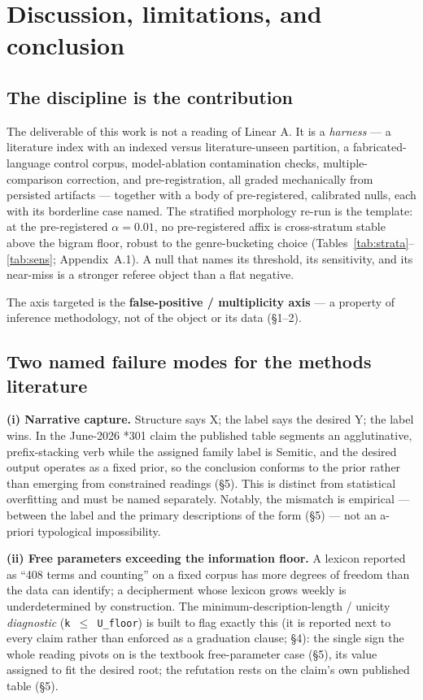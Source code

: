 \section{Discussion, limitations, and conclusion}

\subsection{The discipline is the contribution}

The deliverable of this work is not a reading of Linear A. It is a
\emph{harness} --- a literature index with an indexed versus
literature-unseen partition, a fabricated-language control corpus,
model-ablation contamination checks, multiple-comparison correction, and
pre-registration, all graded mechanically from persisted artifacts ---
together with a body of pre-registered, calibrated nulls, each with its
borderline case named. The stratified morphology re-run is the template: at
the pre-registered $\alpha = 0.01$, no pre-registered affix is cross-stratum
stable above the bigram floor, robust to the genre-bucketing choice
(Tables~\ref{tab:strata}--\ref{tab:sens}; Appendix~A.1). A null that
names its threshold, its sensitivity, and its
near-miss is a stronger referee object than a flat negative.

The axis targeted is the \textbf{false-positive / multiplicity axis} ---
a property of inference methodology, not of the object or its data
(\S1--2).

\subsection{Two named failure modes for the methods literature}

\textbf{(i) Narrative capture.} Structure says X; the label says the
desired Y; the label wins. In the June-2026 *301 claim the published table
segments an agglutinative, prefix-stacking verb while the assigned family
label is Semitic, and the desired output operates as a fixed prior, so
the conclusion conforms to the prior rather than emerging from
constrained readings (\S5). This
is distinct from statistical overfitting and must be named separately.
Notably, the mismatch is empirical --- between the label and the primary
descriptions of the form (\S5) --- not an a-priori typological
impossibility.

\textbf{(ii) Free parameters exceeding the information floor.} A lexicon
reported as ``408 terms and counting'' on a fixed corpus has more degrees
of freedom than the data can identify; a decipherment whose lexicon grows
weekly is underdetermined by construction. The minimum-description-length /
unicity \emph{diagnostic} (\texttt{k $\le$ U\_floor}) is built to flag
exactly this (it is reported next to every claim rather than enforced as a
graduation clause; \S4): the single sign the whole
reading pivots on is the textbook free-parameter case (\S5), its value
assigned to fit the desired root; the refutation rests on the claim's own published table (\S5).

